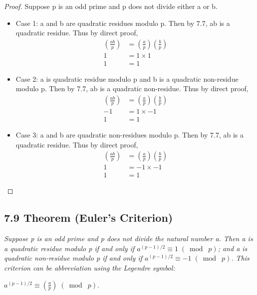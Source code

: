 \documentclass{article}
\begin{document}
\begin{proof}
Suppose p is an odd prime and p does not divide either a or b.
\begin{itemize}
    \item Case 1: a and b are quadratic residues modulo p. Then by 7.7, ab is a quadratic residue. Thus by direct proof,
    \begin{align*}
        && (\frac{ab}{p}) &= (\frac{a}{p})(\frac{b}{p}) &&\\
        && 1 &= 1 \times 1 &&\\
        && 1 &= 1 &&
    \end{align*}
    \item Case 2: a is quadratic residue modulo p and b is a quadratic non-residue modulo p. Then by 7.7, ab is a quadratic non-residue. Thus by direct proof,
    \begin{align*}
        && (\frac{ab}{p}) &= (\frac{a}{p})(\frac{b}{p}) &&\\
        && -1 &= 1 \times -1 &&\\
        && 1 &= 1 &&
    \end{align*}
    \item Case 3: a and b are quadratic non-residues modulo p. Then by 7.7, ab is a quadratic residue. Thus by direct proof,
    \begin{align*}
        && (\frac{ab}{p}) &= (\frac{a}{p})(\frac{b}{p}) &&\\
        && 1 &= -1 \times -1 &&\\
        && 1 &= 1 &&
    \end{align*}
\end{itemize}
\end{proof}

\subsection*{7.9 Theorem (Euler's Criterion)} 
\quad \textit{Suppose p is an odd prime and p does not divide the natural number a. Then a is a quadratic residue modulo p if and only if $a^{(p-1)/2} \equiv 1 \;(\bmod\; p)$; and a is quadratic non-residue modulo p if and only if $a^{(p-1)/2} \equiv -1 \;(\bmod\; p)$. This criterion can be abbreviation using the Legendre symbol:}
\begin{center}
    $a^{(p-1)/2} \equiv (\frac{a}{p}) \;(\bmod\; p)$.
\end{center}
\end{document}

